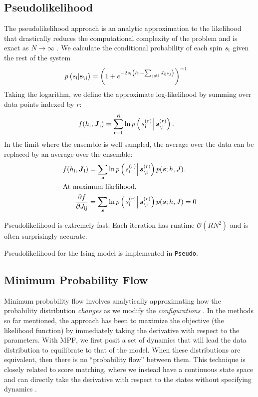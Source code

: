 \documentclass[aps,prl,twocolumn,nofootinbib]{revtex4-1}
\begin{document}
\subsection{Pseudolikelihood}
The pseudolikelihood approach is an analytic approximation to the likelihood that drastically reduces the computational complexity of the problem and is exact as $N \rightarrow \infty$ \cite{Aurell:2012hi}. We calculate the conditional probability of each spin $s_{\rm i}$ given the rest of the system
\begin{align}
	p\left(s_{\rm i}|{\bf s}_{\backslash \rm i}\right) &= \left( 1+e^{-2s_{\rm i} \left(h_{\rm i}+\sum_{j\neq i}J_{\rm ij}s_{\rm j}\right)} \right)^{-1}
\end{align}
Taking the logarithm, we define the approximate log-likelihood by summing over data points indexed by $r$:
\begin{align}
	f(h_{\rm i},\boldsymbol{J}_{\rm i}) &= \sum_{\rm r=1}^R \ln p\left(\left.s_{\rm i}^{(r)}\right|\boldsymbol{s}_{\backslash\rm i}^{(r)}\right).
\end{align}
In the limit where the ensemble is well sampled, the average over the data can be replaced by an average over the ensemble:
\begin{align}
	f(h_{\rm i},\boldsymbol{J}_{\rm i}) &= \sum_{\boldsymbol{s}} \ln p\left(\left.s_{\rm i}^{(r)}\right|\boldsymbol{s}_{\backslash\rm i}^{(r)}\right)p(\boldsymbol{s};h,J).\\
\intertext{At maximum likelihood,}
	\frac{\partial f}{\partial J_{\rm ij}} &= \sum_{\boldsymbol{s}} \ln p\left(\left.s_{\rm i}^{(r)}\right|\boldsymbol{s}_{\backslash\rm i}^{(r)}\right)p(\boldsymbol{s};h,J)=0
\end{align}

Pseudolikelihood is extremely fast. Each iteration has runtime $\mathcal{O}(RN^2)$ and is often surprisingly accurate.

Pseudolikelihood for the Ising model is implemented in {\tt Pseudo}.

\subsection{Minimum Probability Flow}
Minimum probability flow involves analytically approximating how the probability distribution \textit{changes} as we modify the \textit{configurations} \cite{Sohl-Dickstein:2009tt,SohlDickstein:2011im}. In the methods so far mentioned, the approach has been to maximize the objective (the likelihood function) by immediately taking the derivative with respect to the parameters. With MPF, we first posit a set of dynamics that will lead the data distribution to equilibrate to that of the model. When these distributions are equivalent, then there is no ``probability flow'' between them. This technique is closely related to score matching, where we instead have a continuous state space and can directly take the derivative with respect to the states without specifying dynamics \cite{Hyvarinen:2007ed}.
\end{document}
